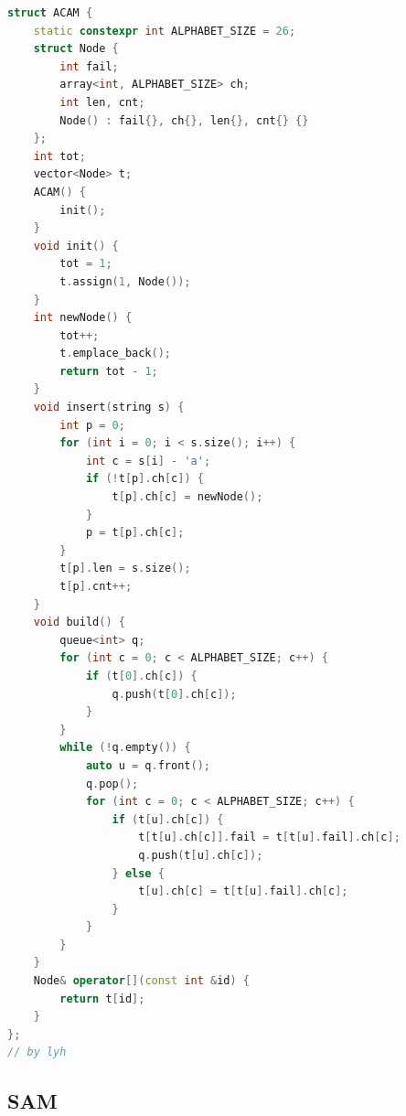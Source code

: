 \begin{lstlisting}[language=C++]
struct ACAM {
    static constexpr int ALPHABET_SIZE = 26;
    struct Node {
        int fail;
        array<int, ALPHABET_SIZE> ch;
        int len, cnt;
        Node() : fail{}, ch{}, len{}, cnt{} {}
    };
    int tot;
    vector<Node> t;
    ACAM() {
        init();
    }
    void init() {
        tot = 1;
        t.assign(1, Node());
    }
    int newNode() {
        tot++;
        t.emplace_back();
        return tot - 1;
    }
    void insert(string s) {
        int p = 0;
        for (int i = 0; i < s.size(); i++) {
            int c = s[i] - 'a';
            if (!t[p].ch[c]) {
                t[p].ch[c] = newNode();
            }
            p = t[p].ch[c];
        }
        t[p].len = s.size();
        t[p].cnt++;
    }
    void build() {
        queue<int> q;
        for (int c = 0; c < ALPHABET_SIZE; c++) {
            if (t[0].ch[c]) {
                q.push(t[0].ch[c]);
            }
        }
        while (!q.empty()) {
            auto u = q.front();
            q.pop();
            for (int c = 0; c < ALPHABET_SIZE; c++) {
                if (t[u].ch[c]) {
                    t[t[u].ch[c]].fail = t[t[u].fail].ch[c];
                    q.push(t[u].ch[c]);
                } else {
                    t[u].ch[c] = t[t[u].fail].ch[c];
                }
            }
        }
    }
    Node& operator[](const int &id) {
        return t[id];
    }
};
// by lyh
\end{lstlisting}

\subsection{SAM}

